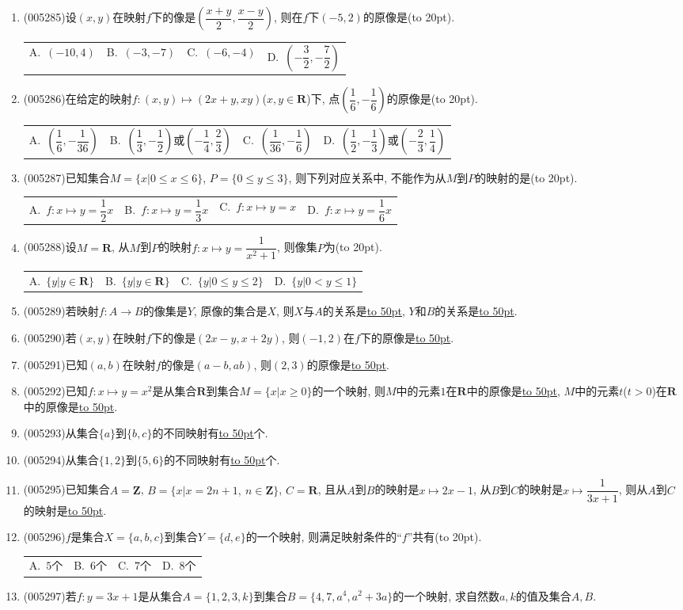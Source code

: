 \documentclass[10pt,a4paper]{article}
\newcommand{\blank}[1]{\underline{\hbox to #1pt{}}}
\newcommand{\bracket}[1]{(\hbox to #1pt{})}
\newcommand{\fourch}[4]{\par\begin{tabular}{p{.23\textwidth}p{.23\textwidth}p{.23\textwidth}p{.23\textwidth}}
A.~#1 &B.~#2& C.~#3& D.~#4
\end{tabular}}
\begin{document}
\begin{enumerate}[1.]
\item {\tiny (005285)}设$(x,y)$在映射$f$下的像是$(\dfrac{x+y}2,\dfrac{x-y}2)$, 则在$f$下$(-5,2)$的原像是\bracket{20}.
\fourch{$(-10,4)$}{$(-3,-7)$}{$(-6,-4)$}{$(-\dfrac 32,-\dfrac 72)$}
\item {\tiny (005286)}在给定的映射$f:(x,y)\mapsto (2x+y,xy)$($x,y\in \mathbf{R}$)下, 点$(\dfrac 16,-\dfrac 16)$的原像是\bracket{20}.
\fourch{$(\dfrac 16,-\dfrac 1{36})$}{$(\dfrac 13,-\dfrac 12)$或$(-\dfrac 14,\dfrac 23)$}{$(\dfrac 1{36},-\dfrac 16)$}{$(\dfrac 12,-\dfrac 13)$或$(-\dfrac 23,\dfrac 14)$}
\item {\tiny (005287)}已知集合$M=\{x|0\le x\le 6\}$, $P=\{0\le y\le 3\}$, 则下列对应关系中, 不能作为从$M$到$P$的映射的是\bracket{20}.
\fourch{$f:x\mapsto y=\dfrac 12x$}{$f:x\mapsto y=\dfrac 13x$}{$f:x\mapsto y=x$}{$f:x\mapsto y=\dfrac 16x$}
\item {\tiny (005288)}设$M=\mathbf{R}$, 从$M$到$P$的映射$f:x\mapsto y=\dfrac 1{x^2+1}$, 则像集$P$为\bracket{20}.
\fourch{$\{y|y\in \mathbf{R}\}$}{$\{y|y\in \mathbf{R}\}$}{$\{y|0\le y\le 2\}$}{$\{y|0<y\le 1\}$}
\item {\tiny (005289)}若映射$f:A\to B$的像集是$Y$, 原像的集合是$X$, 则$X$与$A$的关系是\blank{50}, $Y$和$B$的关系是\blank{50}.
\item {\tiny (005290)}若$(x,y)$在映射$f$下的像是$(2x-y,x+2y)$, 则$(-1,2)$在$f$下的原像是\blank{50}.
\item {\tiny (005291)}已知$(a,b)$在映射$f$的像是$(a-b,ab)$, 则$(2,3)$的原像是\blank{50}.
\item {\tiny (005292)}已知$f:x\mapsto y=x^2$是从集合$\mathbf{R}$到集合$M=\{x|x\ge 0\}$的一个映射, 则$M$中的元素$1$在$\mathbf{R}$中的原像是\blank{50}, $M$中的元素$t$($t>0$)在$\mathbf{R}$中的原像是\blank{50}.
\item {\tiny (005293)}从集合$\{a\}$到$\{b,c\}$的不同映射有\blank{50}个.
\item {\tiny (005294)}从集合$\{1,2\}$到$\{5,6\}$的不同映射有\blank{50}个.
\item {\tiny (005295)}已知集合$A=\mathbf{Z}$, $B=\{x|x=2n+1, \ n\in \mathbf{Z}\}$, $C=\mathbf{R}$, 且从$A$到$B$的映射是$x\mapsto 2x-1$, 从$B$到$C$的映射是$x\mapsto \dfrac 1{3x+1}$, 则从$A$到$C$的映射是\blank{50}.
\item {\tiny (005296)}$f$是集合$X=\{a,b,c\}$到集合$Y=\{d,e\}$的一个映射, 则满足映射条件的``$f$''共有\bracket{20}.
\fourch{$5$个}{$6$个}{$7$个}{$8$个}
\item {\tiny (005297)}若$f:y=3x+1$是从集合$A=\{1,2,3,k\}$到集合$B=\{4,7,a^4,a^2+3a\}$的一个映射, 求自然数$a,k$的值及集合$A,B$.

\end{enumerate}
\end{document}
